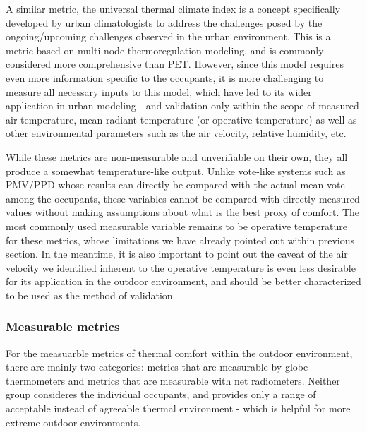     A similar metric, the universal thermal climate index \cite{blazejczyk_comparison_2012} is a concept specifically developed by urban climatologists to address the challenges posed by the ongoing/upcoming challenges observed in the urban environment. This is a metric based on multi-node thermoregulation modeling, and is commonly considered more comprehensive than PET. However, since this model requires even more information specific to the occupants, it is more challenging to measure all necessary inputs to this model, which have led to its wider application in urban modeling - and validation only within the scope of measured air temperature, mean radiant temperature (or operative temperature) as well as other environmental parameters such as the air velocity, relative humidity, etc\cite{nikolopoulou_thermal_2001}. 

    While these metrics are non-measurable and unverifiable on their own, they all produce a somewhat temperature-like output. Unlike vote-like systems such as PMV/PPD whose results can directly be compared with the actual mean vote among the occupants, these variables cannot be compared with directly measured values without making assumptions about what is the best proxy of comfort. The most commonly used measurable variable remains to be operative temperature for these metrics, whose limitations we have already pointed out within previous section. In the meantime, it is also important to point out the caveat of the air velocity we identified inherent to the operative temperature is even less desirable for its application in the outdoor environment, and should be better characterized to be used as the method of validation. 
\subsubsection{Measurable metrics}
    For the measuarble metrics of thermal comfort within the outdoor environment, there are mainly two categories: metrics that are measurable by globe thermometers and metrics that are measurable with net radiometers. Neither group consideres the individual occupants, and provides only a range of acceptable instead of agreeable thermal environment - which is helpful for more extreme outdoor environments.  

